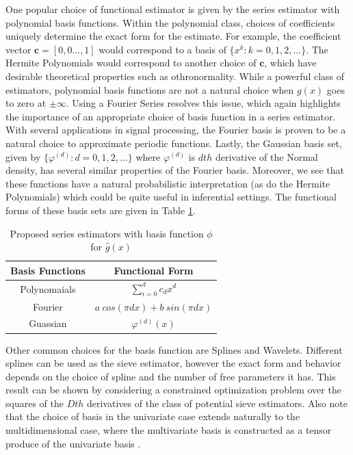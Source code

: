 \documentclass[12pt]{article}  %
\begin{document}
One popular choice of functional estimator is given by the series estimator with polynomial basis functions. Within the polynomial class, choices of coefficients uniquely determine the exact form for the estimate. For example, the coefficient vector $\textbf{c} = [0,0 \ldots, 1]$ would correspond to a basis of $\{x^{k}: k = 0,1,2,\ldots\}$. The Hermite Polynomials would correspond to another choice of $\textbf{c}$, which have desirable theoretical properties such as othronormality. While a powerful class of estimators, polynomial basis functions are not a natural choice when $g(x)$ goes to zero at $\pm \infty$. Using a Fourier Series resolves this issue, which again highlights the importance of an appropriate choice of basis function in a series estimator. With several applications in signal processing, the Fourier basis is proven to be a natural choice to approximate periodic functions. Lastly, the Gaussian basis set, given by $\{\varphi^{(d)}:d= 0,1,2,\dots\}$ where $\varphi^{(d)}$ is $dth$ derivative of the Normal density, has several similar properties of the Fourier basis. Moreover, we see that these functions have a natural probabilistic interpretation (as do the Hermite Polynomials) which could be quite useful in inferential settings. The functional forms of these basis sets are given in Table \ref{tab:basis}. 

\begin{table}[h]
\begin{center}
\begin{tabular}{|c|c|}
\hline
Basis Functions & Functional Form\\
\hline
Polynomaials & $\sum_{i=0}^{d} c_d x^d$\\
Fourier &$a~cos(\pi d x) + b~sin(\pi d x)$\\
Guassian &$\varphi^{(d)}(x)$\\
\hline
\end{tabular}
\caption {Proposed series estimators with basis function $\phi$ for $\hat{g}(x)$ }
\label{tab:basis}
\end{center}
\end{table}
Other common choices for the basis function are Splines and Wavelets.  Different splines can be used as the sieve estimator, however the exact form and behavior depends on the choice of spline and the number of free parameters it has.  This result can be shown by considering a constrained optimization problem over the squares of the $Dth$ derivatives of the class of potential sieve estimators. Also note that the choice of basis in the univariate case extends naturally to the multidimensional case, where the multivariate basis is constructed as a tensor produce of the univariate basis \cite{Chen}.
\end{document}
